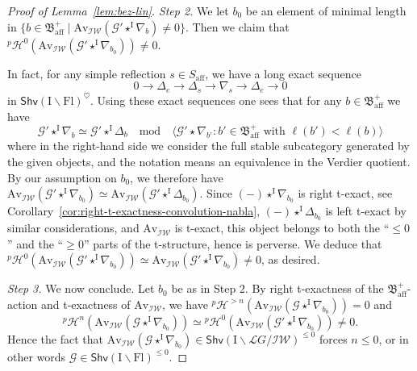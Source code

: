 \documentclass[11pt]{amsart}
\numberwithin{equation}{section}
\theoremstyle{plain}
\theoremstyle{definition}
\newcommand{\sG}{{\mathcal G}}
\newcommand{\sH}{{\mathcal H}}
\newcommand{\I}{{\mathrm I}}
\newcommand{\sL}{{\mathcal L}}
\newcommand{\Av}{\mathrm{Av}}
\newcommand{\IW}{\mathcal{IW}}
\newcommand{\af}{\mathrm{aff}}
\newcommand{\Shv}{\mathsf{Shv}}
\newcommand{\Fl}{\mathrm{Fl}}
\begin{document}
\begin{proof}[Proof of Lemma~\ref{lem:bez-lin}]
\textit{Step 2.} 
We let $b_0$ be an element of minimal length in $\{b\in \mathfrak{B}^+_\af \mid \Av_\IW(\sG'\star^{\I}\nabla_{b})\neq 0\}$. Then we claim that ${}^p\sH^0(\Av_\IW(\sG'\star^{\I}\nabla_{b_0}))\neq 0$. 

In fact, for any simple reflection $s\in S_\af$, we have a
long exact sequence
\begin{equation*}
0\rightarrow \Delta_e \rightarrow \Delta_s \rightarrow \nabla_s \rightarrow \Delta_e \rightarrow 0
\end{equation*} 
in $\Shv(\I\backslash \Fl)^\heartsuit$.
Using these exact sequences one sees
that for any $b\in \mathfrak{B}_\af^+$ 
we have
\[
\sG'\star^{\I}\nabla_{b} \simeq \sG'\star^{\I}\Delta_{b} \quad \text{mod}\quad \langle \sG'\star\nabla_{b'} : b' \in \mathfrak{B}_\af^+ \text{ with } \ell(b')<\ell(b)\rangle
\]
where in the right-hand side we consider the full stable subcategory generated by the given objects, and the notation means an equivalence in the Verdier quotient.
By our assumption on $b_0$, we therefore have $\Av_{\IW}(\sG'\star^{\I}\nabla_{b_0}) \simeq \Av_{\IW}(\sG'\star^{\I}\Delta_{b_0})$. Since $(-) \star^{\I}\nabla_{b_0}$ is right t-exact, see Corollary~\ref{cor:right-t-exactness-convolution-nabla}, $(-)\star^{\I}\Delta_{b_0}$ is left t-exact by similar considerations, and $\Av_{\IW}$ is t-exact, this object belongs to both the ``$\leq 0$'' and the ``$\geq 0$'' parts of the t-structure, hence is perverse. 
We deduce that ${}^p\sH^0(\Av_\IW(\sG'\star^{\I}\nabla_{b_0}))\simeq \Av_\IW(\sG'\star^{\I}\nabla_{b_0})\neq 0$, as desired.

\textit{Step 3.} 
We now conclude. Let $b_0$ be as in Step 2.
By right t-exactness of the $\mathfrak{B}_\af^+$-action and t-exactness of $\Av_\IW$, we have ${}^p\sH^{>n}(\Av_\IW(\sG\star^{\I}\nabla_{b_0}))=0$ and 
\[
{}^p\sH^n(\Av_\IW(\sG\star^{\I}\nabla_{b_0}))\simeq {}^p\sH^0(\Av_\IW(\sG'\star^{\I}\nabla_{b_0})) \neq 0. 
\]
Hence the fact that $\Av_\IW(\sG \star^{\I}\nabla_{b_0})\in \Shv(\I\backslash \sL{G}/\IW)^{\leq 0}$ forces $n\leq 0$, or in other words $\sG\in \Shv(\I\backslash \Fl)^{\leq 0}$. 
\end{proof}
\end{document}

